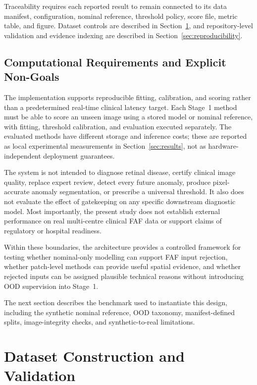\documentclass[fleqn,12pt]{olplainarticle}
\begin{document}
Traceability requires each reported result to remain connected to its data
manifest, configuration, nominal reference, threshold policy, score file,
metric table, and figure. Dataset controls are described in
Section~\ref{sec:dataset}, and repository-level validation and evidence
indexing are described in Section~\ref{sec:reproducibility}.

\subsection{Computational Requirements and Explicit Non-Goals}
\label{subsec:computational_non_goals}

The implementation supports reproducible fitting, calibration, and scoring
rather than a predetermined real-time clinical latency target. Each Stage~1
method must be able to score an unseen image using a stored model or nominal
reference, with fitting, threshold calibration, and evaluation executed
separately. The evaluated methods have different storage and inference costs;
these are reported as local experimental measurements in
Section~\ref{sec:results}, not as hardware-independent deployment guarantees.

The system is not intended to diagnose retinal disease, certify clinical image
quality, replace expert review, detect every future anomaly, produce
pixel-accurate anomaly segmentation, or prescribe a universal threshold. It
also does not evaluate the effect of gatekeeping on any specific downstream
diagnostic model. Most importantly, the present study does not establish
external performance on real multi-centre clinical FAF data or support claims
of regulatory or hospital readiness.

Within these boundaries, the architecture provides a controlled framework for
testing whether nominal-only modelling can support FAF input rejection,
whether patch-level methods can provide useful spatial evidence, and whether
rejected inputs can be assigned plausible technical reasons without
introducing OOD supervision into Stage~1.

The next section describes the benchmark used to instantiate this design,
including the synthetic nominal reference, OOD taxonomy, manifest-defined
splits, image-integrity checks, and synthetic-to-real limitations.


\newpage

\section{Dataset Construction and Validation}
\label{sec:dataset}
\end{document}
